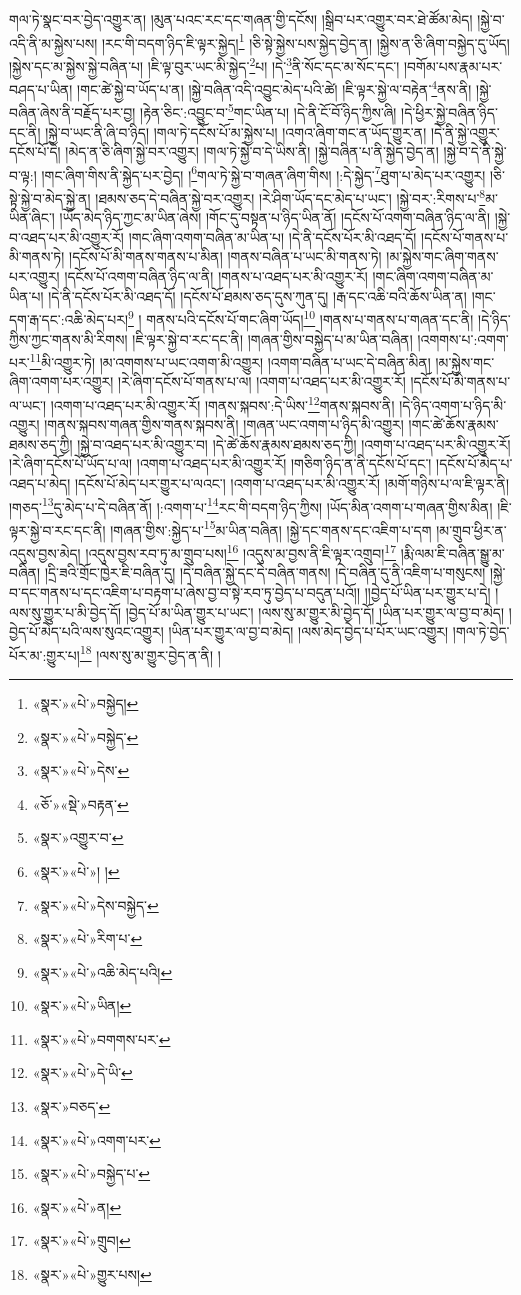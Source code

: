 གལ་ཏེ་སྣང་བར་བྱེད་འགྱུར་ན། །མུན་པའང་རང་དང་གཞན་གྱི་དངོས། །སྒྲིབ་པར་འགྱུར་བར་ཐེ་ཚོམ་མེད། །སྐྱེ་བ་འདི་ནི་མ་སྐྱེས་པས། །རང་གི་བདག་ཉིད་ཇི་ལྟར་སྐྱེད།\footnote{«སྣར་»«པེ་»བསྐྱེད།} །ཅི་སྟེ་སྐྱེས་པས་སྐྱེད་བྱེད་ན། །སྐྱེས་ན་ཅི་ཞིག་བསྐྱེད་དུ་ཡོད། །སྐྱེས་དང་མ་སྐྱེས་སྐྱེ་བཞིན་པ། །ཇི་ལྟ་བུར་ཡང་མི་སྐྱེད་\footnote{«སྣར་»«པེ་»བསྐྱེད་}པ། །དེ་\footnote{«སྣར་»«པེ་»དེས་}ནི་སོང་དང་མ་སོང་དང་། །བགོམ་པས་རྣམ་པར་བཤད་པ་ཡིན། །གང་ཚེ་སྐྱེ་བ་ཡོད་པ་ན། །སྐྱེ་བཞིན་འདི་འབྱུང་མེད་པའི་ཚེ། །ཇི་ལྟར་སྐྱེ་ལ་བརྟེན་\footnote{«ཅོ་»«སྡེ་»བརྟན་}ནས་ནི། །སྐྱེ་བཞིན་ཞེས་ནི་བརྗོད་པར་བྱ། །རྟེན་ཅིང་:འབྱུང་བ་\footnote{«སྣར་»འགྱུར་བ་}གང་ཡིན་པ། །དེ་ནི་ངོ་བོ་ཉིད་ཀྱིས་ཞི། །དེ་ཕྱིར་སྐྱེ་བཞིན་ཉིད་དང་ནི། །སྐྱེ་བ་ཡང་ནི་ཞི་བ་ཉིད། །གལ་ཏེ་དངོས་པོ་མ་སྐྱེས་པ། །འགའ་ཞིག་གང་ན་ཡོད་གྱུར་ན། །དེ་ནི་སྐྱེ་འགྱུར་དངོས་པོ་དེ། །མེད་ན་ཅི་ཞིག་སྐྱེ་བར་འགྱུར། །གལ་ཏེ་སྐྱེ་བ་དེ་ཡིས་ནི། །སྐྱེ་བཞིན་པ་ནི་སྐྱེད་བྱེད་ན། །སྐྱེ་བ་དེ་ནི་སྐྱེ་བ་ལྟ:། །གང་ཞིག་གིས་ནི་སྐྱེད་པར་བྱེད། །\footnote{«སྣར་»«པེ་»། །}གལ་ཏེ་སྐྱེ་བ་གཞན་ཞིག་གིས། །:དེ་སྐྱེད་\footnote{«སྣར་»«པེ་»དེས་བསྐྱེད་}ཐུག་པ་མེད་པར་འགྱུར། །ཅི་སྟེ་སྐྱེ་བ་མེད་སྐྱེ་ན། །ཐམས་ཅད་དེ་བཞིན་སྐྱེ་བར་འགྱུར། །རེ་ཤིག་ཡོད་དང་མེད་པ་ཡང་། །སྐྱེ་བར་:རིགས་པ་\footnote{«སྣར་»«པེ་»རིག་པ་}མ་ཡིན་ཞིང་། །ཡོད་མེད་ཉིད་ཀྱང་མ་ཡིན་ཞེས། །གོང་དུ་བསྟན་པ་ཉིད་ཡིན་ནོ། །དངོས་པོ་འགག་བཞིན་ཉིད་ལ་ནི། །སྐྱེ་བ་འཐད་པར་མི་འགྱུར་རོ། །གང་ཞིག་འགག་བཞིན་མ་ཡིན་པ། །དེ་ནི་དངོས་པོར་མི་འཐད་དོ། །དངོས་པོ་གནས་པ་མི་གནས་ཏེ། །དངོས་པོ་མི་གནས་གནས་པ་མིན། །གནས་བཞིན་པ་ཡང་མི་གནས་ཏེ། །མ་སྐྱེས་གང་ཞིག་གནས་པར་འགྱུར། །དངོས་པོ་འགག་བཞིན་ཉིད་ལ་ནི། །གནས་པ་འཐད་པར་མི་འགྱུར་རོ། །གང་ཞིག་འགག་བཞིན་མ་ཡིན་པ། །དེ་ནི་དངོས་པོར་མི་འཐད་དོ། །དངོས་པོ་ཐམས་ཅད་དུས་ཀུན་དུ། །རྒ་དང་འཆི་བའི་ཆོས་ཡིན་ན། །གང་དག་རྒ་དང་:འཆི་མེད་པར།\footnote{«སྣར་»«པེ་»འཆི་མེད་པའི།} །
གནས་པའི་དངོས་པོ་གང་ཞིག་ཡོད།\footnote{«སྣར་»«པེ་»ཡིན།} །གནས་པ་གནས་པ་གཞན་དང་ནི། །དེ་ཉིད་ཀྱིས་ཀྱང་གནས་མི་རིགས། །ཇི་ལྟར་སྐྱེ་བ་རང་དང་ནི། །གཞན་གྱིས་བསྐྱེད་པ་མ་ཡིན་བཞིན། །འགགས་པ་:འགག་པར་\footnote{«སྣར་»«པེ་»བགགས་པར་}མི་འགྱུར་ཏེ། །མ་འགགས་པ་ཡང་འགག་མི་འགྱུར། །འགག་བཞིན་པ་ཡང་དེ་བཞིན་མིན། །མ་སྐྱེས་གང་ཞིག་འགག་པར་འགྱུར། །རེ་ཞིག་དངོས་པོ་གནས་པ་ལ། །འགག་པ་འཐད་པར་མི་འགྱུར་རོ། །དངོས་པོ་མི་གནས་པ་ལ་ཡང་། །འགག་པ་འཐད་པར་མི་འགྱུར་རོ། །གནས་སྐབས་:དེ་ཡིས་\footnote{«སྣར་»«པེ་»དེ་ཡི་}གནས་སྐབས་ནི། །དེ་ཉིད་འགག་པ་ཉིད་མི་འགྱུར། །གནས་སྐབས་གཞན་གྱིས་གནས་སྐབས་ནི། །གཞན་ཡང་འགག་པ་ཉིད་མི་འགྱུར། །གང་ཚེ་ཆོས་རྣམས་ཐམས་ཅད་ཀྱི། །སྐྱེ་བ་འཐད་པར་མི་འགྱུར་བ། །དེ་ཚེ་ཆོས་རྣམས་ཐམས་ཅད་ཀྱི། །འགག་པ་འཐད་པར་མི་འགྱུར་རོ། །རེ་ཞིག་དངོས་པོ་ཡོད་པ་ལ། །འགག་པ་འཐད་པར་མི་འགྱུར་རོ། །གཅིག་ཉིད་ན་ནི་དངོས་པོ་དང་། །དངོས་པོ་མེད་པ་འཐད་པ་མེད། །དངོས་པོ་མེད་པར་གྱུར་པ་ལའང་། །འགག་པ་འཐད་པར་མི་འགྱུར་རོ། །མགོ་གཉིས་པ་ལ་ཇི་ལྟར་ནི། །གཅད་\footnote{«སྣར་»བཅད་}དུ་མེད་པ་དེ་བཞིན་ནོ། །:འགག་པ་\footnote{«སྣར་»«པེ་»འགག་པར་}རང་གི་བདག་ཉིད་ཀྱིས། །ཡོད་མིན་འགག་པ་གཞན་གྱིས་མིན། །ཇི་ལྟར་སྐྱེ་བ་རང་དང་ནི། །གཞན་གྱིས་:སྐྱེད་པ་\footnote{«སྣར་»«པེ་»བསྐྱེད་པ་}མ་ཡིན་བཞིན། །སྐྱེ་དང་གནས་དང་འཇིག་པ་དག །མ་གྲུབ་ཕྱིར་ན་འདུས་བྱས་མེད། །འདུས་བྱས་རབ་ཏུ་མ་གྲུབ་པས།\footnote{«སྣར་»«པེ་»ན།} །འདུས་མ་བྱས་ནི་ཇི་ལྟར་འགྲུབ།\footnote{«སྣར་»«པེ་»གྲུབ།} །རྨི་ལམ་ཇི་བཞིན་སྒྱུ་མ་བཞིན། །དྲི་ཟའི་གྲོང་ཁྱེར་ཇི་བཞིན་དུ། །དེ་བཞིན་སྐྱེ་དང་དེ་བཞིན་གནས། །དེ་བཞིན་དུ་ནི་འཇིག་པ་གསུངས། །སྐྱེ་བ་དང་གནས་པ་དང་འཇིག་པ་བརྟག་པ་ཞེས་བྱ་བ་སྟེ་རབ་ཏུ་བྱེད་པ་བདུན་པའོ།། །།བྱེད་པོ་ཡིན་པར་གྱུར་པ་དེ། །ལས་སུ་གྱུར་པ་མི་བྱེད་དོ། །བྱེད་པོ་མ་ཡིན་གྱུར་པ་ཡང་། །ལས་སུ་མ་གྱུར་མི་བྱེད་དོ། །ཡིན་པར་གྱུར་ལ་བྱ་བ་མེད། །བྱེད་པོ་མེད་པའི་ལས་སུའང་འགྱུར། །ཡིན་པར་གྱུར་ལ་བྱ་བ་མེད། །ལས་མེད་བྱེད་པ་པོར་ཡང་འགྱུར། །གལ་ཏེ་བྱེད་པོར་མ་:གྱུར་པ།\footnote{«སྣར་»«པེ་»གྱུར་པས།} །ལས་སུ་མ་གྱུར་བྱེད་ན་ནི། །
